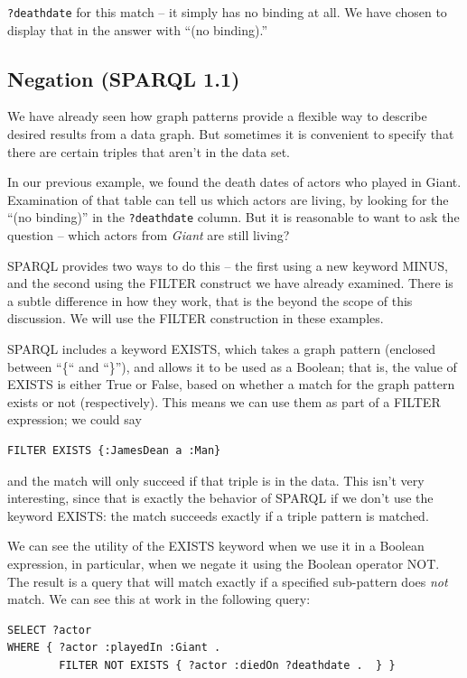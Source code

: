 \texttt{?deathdate} for this match -- it simply has no binding at all. We have
chosen to display that in the answer with ``(no binding).''

\subsection{Negation (SPARQL 1.1)}
\label{negation}

We have already seen how graph patterns provide a flexible way to
describe desired results from a data graph. But sometimes it is
convenient to specify that there are certain triples that aren't in the
data set.

In our previous example, we found the death dates of actors who played
in Giant. Examination of that table can tell us which actors are living,
by looking for the ``(no binding)'' in the \texttt{?deathdate} column. But it is
reasonable to want to ask the question -- which actors from \emph{Giant}
are still living?

SPARQL provides two ways to do this -- the first using a new keyword
MINUS, and the second using the FILTER construct we have already
examined. There is a subtle difference in how they work, that is the
beyond the scope of this discussion. We will use the FILTER construction
in these examples.

SPARQL includes a keyword EXISTS, which takes a graph pattern (enclosed
between ``\{`` and ``\}''), and allows it to be used as a Boolean; that
is, the value of EXISTS is either True or False, based on whether a
match for the graph pattern exists or not (respectively). This means we
can use them as part of a FILTER expression; we could say

\begin{lstlisting}
FILTER EXISTS {:JamesDean a :Man} 
\end{lstlisting}

and the match will only succeed if that triple is
in the data. This isn't very interesting, since that is exactly the
behavior of SPARQL if we don't use the keyword EXISTS: the match
succeeds exactly if a triple pattern is matched.

We can see the utility of the EXISTS keyword when we use it in a Boolean
expression, in particular, when we negate it using the Boolean operator
NOT. The result is a query that will match exactly if a specified
sub-pattern does \emph{not} match. We can see this at work in the
following query:

\begin{lstlisting}
SELECT ?actor
WHERE { ?actor :playedIn :Giant .
        FILTER NOT EXISTS { ?actor :diedOn ?deathdate .  } }
\end{lstlisting}

